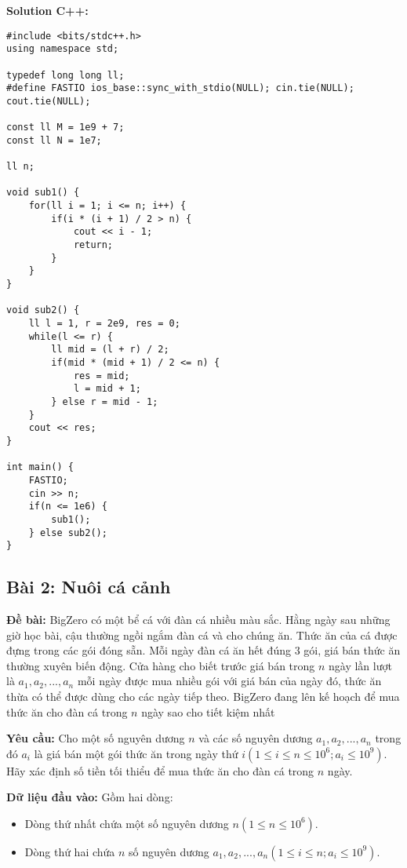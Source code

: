 \documentclass[12pt]{scrartcl}  %
\begin{document}
\textbf{Solution C++:}
\begin{lstlisting}
#include <bits/stdc++.h>
using namespace std;

typedef long long ll;
#define FASTIO ios_base::sync_with_stdio(NULL); cin.tie(NULL); cout.tie(NULL);

const ll M = 1e9 + 7;
const ll N = 1e7;

ll n;

void sub1() {
    for(ll i = 1; i <= n; i++) {
        if(i * (i + 1) / 2 > n) {
            cout << i - 1;
            return;
        }
    }
}

void sub2() {
    ll l = 1, r = 2e9, res = 0;
    while(l <= r) {
        ll mid = (l + r) / 2;
        if(mid * (mid + 1) / 2 <= n) {
            res = mid;
            l = mid + 1;
        } else r = mid - 1;
    }
    cout << res;
}

int main() {
    FASTIO;
    cin >> n;
    if(n <= 1e6) {
        sub1();
    } else sub2();
}

\end{lstlisting}


\subsection{Bài 2: Nuôi cá cảnh}
\textbf{Đề bài:}
BigZero có một bể cá với đàn cá nhiều màu sắc. Hằng ngày sau những giờ học bài, cậu thường ngồi 
ngắm đàn cá và cho chúng ăn. Thức ăn của cá được đựng trong các gói đóng sẵn. Mỗi ngày đàn cá ăn hết đúng $3$ gói, giá bán thức ăn thường xuyên 
biến động. Cửa hàng cho biết trước giá bán trong $n$ ngày lần lượt là $a_1, a_2, ..., a_n$ mỗi ngày được mua nhiều gói với giá bán của ngày đó, thức ăn 
thừa có thể được dùng cho các ngày tiếp theo. BigZero đang lên kế hoạch để mua thức ăn cho đàn cá trong $n$ ngày sao cho tiết kiệm nhất 

\textbf{Yêu cầu:}
Cho một số nguyên dương $n$ và các số nguyên dương $a_1, a_2, ..., a_n$ trong đó $a_i$ là giá bán một gói thức ăn trong ngày thứ $i (1 \leq i \leq n \leq 10^6; a_i \leq 10^9)$. Hãy xác định số tiền tối thiểu để mua thức ăn cho đàn cá trong $n$ ngày. 

\textbf{Dữ liệu đầu vào:}
Gồm hai dòng:
\begin{itemize}
    \item Dòng thứ nhất chứa một số nguyên dương $n (1 \leq n \leq 10^6)$.
    \item Dòng thứ hai chứa $n$ số nguyên dương $a_1, a_2, ..., a_n (1 \leq i \leq n; a_i \leq 10^9)$.
\end{itemize}
\end{document}
